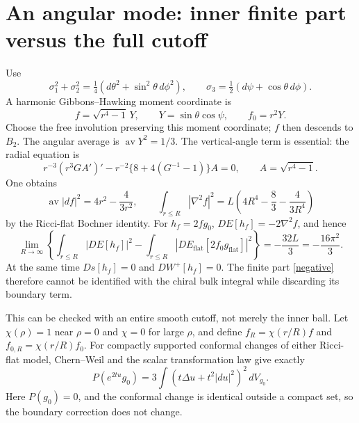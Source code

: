 \documentclass[11pt]{article}
\newcommand{\dd}{\,d}
\newcommand{\fint}{\operatorname{av}}
\begin{document}
\section{An angular mode: inner finite part versus the full cutoff}
Use
\[
 \sigma_1^2+\sigma_2^2=\tfrac14(d\theta^2+\sin^2\theta\,d\phi^2),
 \qquad \sigma_3=\tfrac12(d\psi+\cos\theta\,d\phi).
\]
A harmonic Gibbons--Hawking moment coordinate is
\[
 f=\sqrt{r^4-1}\,Y,\qquad Y=\sin\theta\cos\psi,
 \qquad f_0=r^2Y.
\]
Choose the free involution preserving this moment coordinate; $f$ then
descends to $B_2$. The angular average is $\fint Y^2=1/3$.
The vertical-angle term is essential: the radial equation is
\[
 r^{-3}(r^3GA')'-r^{-2}\{8+4(G^{-1}-1)\}A=0,
 \qquad A=\sqrt{r^4-1}.
\]
One obtains
\[
 \fint|df|^2=4r^2-\frac4{3r^2},\qquad
 \int_{r\le R}|\nabla^2 f|^2
   =L\left(4R^4-\frac83-\frac4{3R^4}\right)
\]
by the Ricci-flat Bochner identity. For $h_f=2fg_0$,
$DE[h_f]=-2\nabla^2f$, and hence
\begin{equation}
 \lim_{R\to\infty}\left\{
 \int_{r\le R}|DE[h_f]|^2-
 \int_{r\le R}|DE_{\mathrm{flat}}[2f_0g_{\mathrm{flat}}]|^2
 \right\}=-\frac{32L}{3}=-\frac{16\pi^2}{3}.\label{negative}
\end{equation}
At the same time $Ds[h_f]=0$ and $DW^+[h_f]=0$.
The finite part \eqref{negative} therefore cannot be identified with
the chiral bulk integral while discarding its boundary term.

This can be checked with an entire smooth cutoff, not merely the inner
ball. Let $\chi(\rho)=1$ near $\rho=0$ and $\chi=0$ for large $\rho$,
and define $f_R=\chi(r/R)f$ and $f_{0,R}=\chi(r/R)f_0$.
For compactly supported conformal changes of either Ricci-flat model,
Chern--Weil and the scalar transformation law give exactly
\[
 P(e^{2tu}g_0)=3\int(t\Delta u+t^2|du|^2)^2\dd V_{g_0}.
\]
Here $P(g_0)=0$, and the conformal change is identical outside a compact
set, so the boundary correction does not change.
\end{document}
